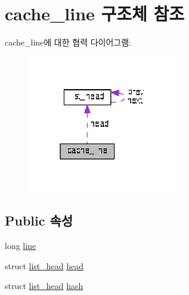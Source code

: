 \hypertarget{structcache__line}{\section{cache\+\_\+line 구조체 참조}
\label{structcache__line}
}


cache\+\_\+line에 대한 협력 다이어그램\+:
\nopagebreak
\begin{figure}[H]
\begin{center}
\leavevmode
\includegraphics[width=187pt]{structcache__line__coll__graph}
\end{center}
\end{figure}
\subsection*{Public 속성}
\begin{DoxyCompactItemize}
\item 
long \hyperlink{structcache__line_a22870a00436e7425597606393d81eb2c}{line}
\item 
struct \hyperlink{structlist__head}{list\+\_\+head} \hyperlink{structcache__line_af231d538713478b74fc7811adc00545b}{head}
\item 
struct \hyperlink{structlist__head}{list\+\_\+head} \hyperlink{structcache__line_a5dc1e6d6a7a0162b2db830f7b230abd4}{hash}
\end{DoxyCompactItemize}


